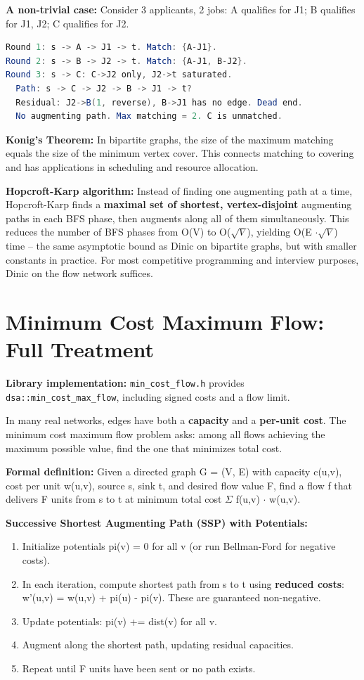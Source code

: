 \textbf{A non-trivial case:} Consider 3 applicants, 2 jobs: A qualifies for J1; B qualifies for J1, J2; C qualifies for J2.

\begin{lstlisting}[language=Java]
Round 1: s -> A -> J1 -> t. Match: {A-J1}.
Round 2: s -> B -> J2 -> t. Match: {A-J1, B-J2}.
Round 3: s -> C: C->J2 only, J2->t saturated.
  Path: s -> C -> J2 -> B -> J1 -> t?
  Residual: J2->B(1, reverse), B->J1 has no edge. Dead end.
  No augmenting path. Max matching = 2. C is unmatched.
\end{lstlisting}

\textbf{Konig's Theorem:} In bipartite graphs, the size of the maximum matching equals the size of the minimum vertex cover. This connects matching to covering and has applications in scheduling and resource allocation.

\textbf{Hopcroft-Karp algorithm:} Instead of finding one augmenting path at a time, Hopcroft-Karp finds a \textbf{maximal set of shortest, vertex-disjoint} augmenting paths in each BFS phase, then augments along all of them simultaneously. This reduces the number of BFS phases from O(V) to O($\sqrt{V}$), yielding O(E $\cdot \sqrt{V}$) time -- the same asymptotic bound as Dinic on bipartite graphs, but with smaller constants in practice. For most competitive programming and interview purposes, Dinic on the flow network suffices.

\section{Minimum Cost Maximum Flow: Full Treatment}

\textbf{Library implementation:} \texttt{min\_cost\_flow.h} provides \texttt{dsa::min\_cost\_max\_flow}, including signed costs and a flow limit.

In many real networks, edges have both a \textbf{capacity} and a \textbf{per-unit cost}. The minimum cost maximum flow problem asks: among all flows achieving the maximum possible value, find the one that minimizes total cost.

\textbf{Formal definition:} Given a directed graph G = (V, E) with capacity c(u,v), cost per unit w(u,v), source s, sink t, and desired flow value F, find a flow f that delivers F units from s to t at minimum total cost $\Sigma $ f(u,v) $\cdot $ w(u,v).

\textbf{Successive Shortest Augmenting Path (SSP) with Potentials:}
\begin{enumerate}
\item Initialize potentials pi(v) = 0 for all v (or run Bellman-Ford for negative costs).
\item In each iteration, compute shortest path from s to t using \textbf{reduced costs}: w'(u,v) = w(u,v) + pi(u) - pi(v). These are guaranteed non-negative.
\item Update potentials: pi(v) += dist(v) for all v.
\item Augment along the shortest path, updating residual capacities.
\item Repeat until F units have been sent or no path exists.
\end{enumerate}


